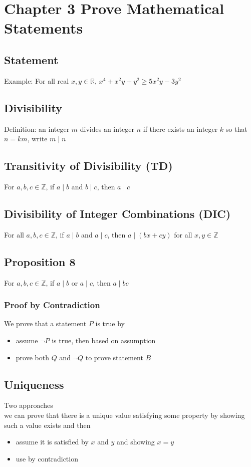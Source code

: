 \documentclass[12pt, letterpaper]{article}
\begin{document}
\section{Chapter 3 Prove Mathematical Statements}
\subsection{Statement}
Example: For all real $x, y \in \mathbb{R}$, $x^4+x^2y+y^2 \geq 5x^2y-3y^2$
\subsection{Divisibility}
Definition: an integer $m$ divides an integer $n$ if there exists an integer $k$ so that $n = km$, write $m \mid n$
\subsection{Transitivity of Divisibility (TD)}
For $a,b,c \in \mathbb{Z}$, if $a \mid b$ and $b \mid c$, then $a \mid c$
\subsection{Divisibility of Integer Combinations (DIC)}
For all $a,b,c \in \mathbb{Z}$, if $a\mid b$ and $a\mid c$, then $a\mid (bx+cy)$ for all $x,y \in \mathbb{Z}$
\subsection{Proposition 8}
For $a,b,c \in \mathbb{Z}$, if $a\mid b$ or $a\mid c$, then $a\mid bc$
\subsubsection{Proof by Contradiction}
We prove that a statement $P$ is true by
\begin{itemize}
    \item assume $\neg P$ is true, then based on assumption
    \item prove both $Q$ and $\neg Q$ to prove statement $B$
\end{itemize}
\subsection{Uniqueness}
Two approaches \\
we can prove that there is a unique value satisfying some property by showing such a value exists and then 
\begin{itemize}
    \item assume it is satisfied by $x$ and $y$ and showing $x=y$
    \item use by contradiction
\end{itemize}
\end{document}
